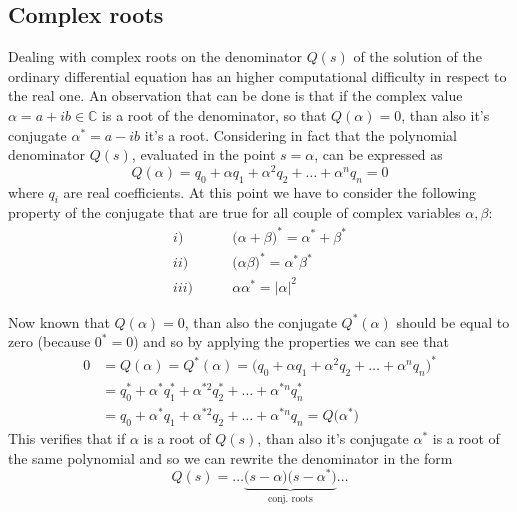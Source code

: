 \subsection{Complex roots} 
	Dealing with complex roots on the denominator $Q(s)$ of the solution of the ordinary differential equation has an higher computational difficulty in respect to the real one. An observation that can be done is that if the complex value $\alpha = a + ib \in \mathds C$ is a root of the denominator, so that $Q(\alpha) = 0$, than also it's conjugate $\alpha^* = a - ib$ it's a root. Considering in fact that the polynomial denominator $Q(s)$, evaluated in the point $s = \alpha$, can be expressed as
	\[Q(\alpha) = q_0 + \alpha q_1 + \alpha^2 q_2 + \dots + \alpha^n q_n = 0 \]
	where $q_i$ are real coefficients. At this point we have to consider the following property of the conjugate that are true for all couple of complex variables $\alpha,\beta$:
	\begin{equation}
	\begin{split}
		i) & \qquad \big( \alpha + \beta \big)^* = \alpha^* + \beta^* \\
		ii) & \qquad \big(\alpha \beta\big)^* = \alpha^*\beta^* \\
		iii) & \qquad \alpha \alpha^* = |\alpha|^2
	\end{split}
	\end{equation}

	Now known that $Q(\alpha) = 0$, than also the conjugate $Q^*(\alpha)$ should be equal to zero (because $0^* = 0$) and so by applying the properties we can see that
	\begin{align*}
		0 & = Q(\alpha) = Q^*(\alpha) = \Big(q_0 + \alpha q_1 + \alpha^2 q_2 + \dots + \alpha^n q_n \Big)^* \\
		& = q_0^* + \alpha^* q_1^* + \alpha^{*2} q_2^* + \dots + \alpha^{*n} q_n^* \\
		& = q_0 + \alpha^* q_1 + \alpha^{*2} q_2 + \dots + \alpha^{*n} q_n
		= Q\big(\alpha^*\big)
	\end{align*}
	This verifies that if $\alpha$ is a root of $Q(s)$, than also it's conjugate $\alpha^*$ is a root of the same polynomial and so we can rewrite the denominator in the form
	\[ Q(s) = \dots \underbrace{\big(s-\alpha\big) \big(s-\alpha^*\big)}_\textrm{conj. roots} \dots \]
	
